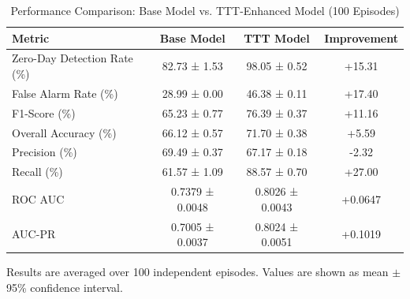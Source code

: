 \begin{table}[htbp]
\centering
\caption{Performance Comparison: Base Model vs. TTT-Enhanced Model (100 Episodes)}
\label{tab:performance}
\begin{tabular}{lccc}
\hline
Metric & Base Model & TTT Model & Improvement \\
\hline
Zero-Day Detection Rate (\%) & 82.73 ± 1.53 & 98.05 ± 0.52 & +15.31 \\
False Alarm Rate (\%) & 28.99 ± 0.00 & 46.38 ± 0.11 & +17.40 \\
F1-Score (\%) & 65.23 ± 0.77 & 76.39 ± 0.37 & +11.16 \\
Overall Accuracy (\%) & 66.12 ± 0.57 & 71.70 ± 0.38 & +5.59 \\
Precision (\%) & 69.49 ± 0.37 & 67.17 ± 0.18 & -2.32 \\
Recall (\%) & 61.57 ± 1.09 & 88.57 ± 0.70 & +27.00 \\
ROC AUC & 0.7379 ± 0.0048 & 0.8026 ± 0.0043 & +0.0647 \\
AUC-PR & 0.7005 ± 0.0037 & 0.8024 ± 0.0051 & +0.1019 \\
\hline
\end{tabular}
\begin{tablenotes}
\small
\item Results are averaged over 100 independent episodes. Values are shown as mean $\pm$ 95\% confidence interval.
\end{tablenotes}
\end{table}
